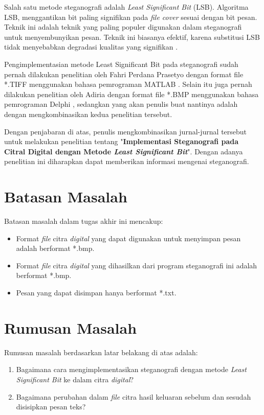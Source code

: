Salah satu metode steganografi adalah \emph{Least Significant Bit} (LSB). Algoritma LSB, menggantikan bit paling signifikan pada \emph{file cover} sesuai dengan bit pesan. Teknik ini adalah teknik yang paling populer digunakan dalam steganografi untuk menyembunyikan pesan. Teknik ini biasanya efektif, karena substitusi LSB tidak menyebabkan degradasi kualitas yang signifikan \cite{joshi}.

Pengimplementasian metode Least Significant Bit pada steganografi sudah pernah dilakukan penelitian oleh Fahri Perdana Prasetyo dengan format file *.TIFF menggunakan bahasa pemrograman MATLAB \cite{prasetyo}. Selain itu juga pernah dilakukan penelitian oleh Adiria dengan format file *.BMP menggunakan bahasa pemrograman Delphi \cite{adiria}, sedangkan yang akan penulis buat nantinya adalah dengan mengkombinasikan kedua penelitian tersebut.

Dengan penjabaran di atas, penulis mengkombinasikan jurnal-jurnal tersebut untuk melakukan penelitian tentang "\textbf{Implementasi Steganografi pada Citral Digital dengan Metode \emph{Least Significant Bit}}". Dengan adanya penelitian ini diharapkan dapat memberikan informasi mengenai steganografi.

\section{Batasan Masalah}
Batasan masalah dalam tugas akhir ini mencakup:
\begin{itemize}
	\item Format \emph{file}  citra \emph{digital} yang dapat digunakan untuk menyimpan pesan adalah berformat *.bmp.
	\item Format \emph{file}  citra \emph{digital} yang dihasilkan dari program steganografi ini adalah berformat *.bmp.
	\item Pesan yang dapat disimpan hanya berformat *.txt.
\end{itemize}

\section{Rumusan Masalah}
Rumusan masalah berdasarkan latar belakang di atas adalah:
\begin{enumerate}
	\item Bagaimana cara mengimplementasikan steganografi dengan metode \emph{Least Significant Bit} ke dalam citra \emph{digital}?
	\item Bagaimana perubahan dalam \emph{file} citra hasil keluaran sebelum dan sesudah disisipkan pesan teks?
\end{enumerate}

